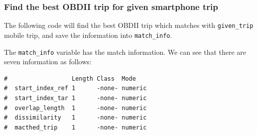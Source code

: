 \documentclass[letterpaper,9pt,twocolumn,twoside,]{pinp}
\begin{document}
\hypertarget{find-the-best-obdii-trip-for-given-smartphone-trip}{%
\subsubsection{Find the best OBDII trip for given smartphone
trip}\label{find-the-best-obdii-trip-for-given-smartphone-trip}}

The following code will find the best OBDII trip which matches with
\texttt{given\_trip} mobile trip, and save the information into
\texttt{match\_info}.

\begin{Shaded}
\begin{Highlighting}[]
\NormalTok{obd2_data[[}\NormalTok{]] <-}\StringTok{ }\NormalTok{obd2_data[[}\NormalTok{]]}
\StringTok{ }\NormalTok{mobile_data[[}\NormalTok{]]}

\StringTok{ }
\end{Highlighting}
\end{Shaded}

The \texttt{match\_info} variable has the match information. We can see
that there are seven information as follows:

\begin{Shaded}
\begin{Highlighting}[]
\end{Highlighting}
\end{Shaded}

\begin{ShadedResult}
\begin{verbatim}
#                  Length Class  Mode   
#  start_index_ref 1      -none- numeric
#  start_index_tar 1      -none- numeric
#  overlap_length  1      -none- numeric
#  dissimilarity   1      -none- numeric
#  macthed_trip    1      -none- numeric
\end{verbatim}
\end{ShadedResult}

\begin{Shaded}
\begin{Highlighting}[]
\end{Highlighting}
\end{Shaded}
\end{document}
